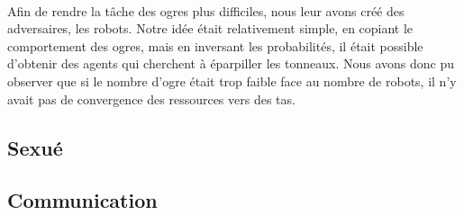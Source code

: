 \paragraph{}
Afin de rendre la tâche des ogres plus difficiles, nous leur avons créé des
adversaires, les robots. Notre idée était relativement simple, en copiant le
comportement des ogres, mais en inversant les probabilités, il était possible
d'obtenir des agents qui cherchent à éparpiller les tonneaux. Nous avons donc
pu observer que si le nombre d'ogre était trop faible face au nombre de robots,
il n'y avait pas de convergence des ressources vers des tas.


\subsection{Sexué}
\subsection{Communication}
